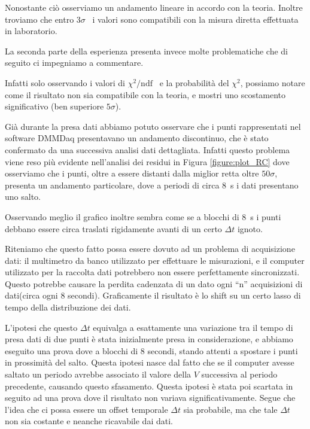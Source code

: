 \documentclass[italian, a4paper, 10pt, twocolumn]{../../style/lab_unige}
\newcommand{\reffig}[1]{Figura {\ref{#1}}}%
\newcommand{\ChiSqr}{$\chi^2$\space}
\newcommand{\ChiNdf}{$\chi^2/\text{ndf}$}
\newcommand{\treSigma}{$3\sigma$}
\begin{document}
    Nonostante ciò osserviamo un andamento lineare in accordo con la teoria.
    Inoltre troviamo che entro \treSigma~ i valori sono compatibili con la misura diretta effettuata in laboratorio.

    La seconda parte della esperienza presenta invece molte problematiche che di seguito ci impegniamo a commentare.

    Infatti solo osservando i valori di \ChiNdf~ e la probabilità del \ChiSqr, possiamo notare come il risultato non sia compatibile con la teoria, e mostri uno scostamento significativo (ben superiore $5\sigma$).

    Già durante la presa dati abbiamo potuto osservare che i punti rappresentati nel software DMMDaq presentavano un andamento discontinuo, che è stato confermato da una successiva analisi dati dettagliata. Infatti questo problema viene reso più evidente nell'analisi dei residui in \reffig{figure:plot_RC} dove osserviamo che i punti, oltre a essere distanti dalla miglior retta oltre $50\sigma$, presenta un andamento particolare, dove a periodi di circa 8~s i dati presentano uno salto.

    Osservando meglio il grafico inoltre sembra come se a blocchi di 8~s i punti debbano essere circa traslati rigidamente avanti di un certo $\Delta t$ ignoto.
    
    Riteniamo che questo fatto possa essere dovuto ad un problema di acquisizione dati: il multimetro da banco  utilizzato per effettuare le misurazioni, e il computer utilizzato per la raccolta dati potrebbero non essere perfettamente sincronizzati. Questo potrebbe causare la perdita cadenzata di un dato ogni “n” acquisizioni di dati(circa ogni 8 secondi). Graficamente il risultato è lo shift su un certo lasso di tempo della distribuzione dei dati.

    L'ipotesi che questo $\Delta t$ equivalga a esattamente una variazione tra il tempo di presa dati di due punti è stata inizialmente presa in considerazione, e abbiamo eseguito una prova dove a blocchi di 8 secondi, stando attenti a spostare i punti in prossimità del salto. Questa ipotesi nasce dal fatto che se il computer avesse saltato un periodo avrebbe associato il valore della $V$ successiva al periodo precedente, causando questo sfasamento. Questa ipotesi è stata poi scartata in seguito ad una prova dove il risultato non variava significativamente. Segue che l'idea che ci possa essere un offset temporale $\Delta t$ sia probabile, ma che tale $\Delta t$ non sia costante e neanche ricavabile dai dati.
\end{document}
